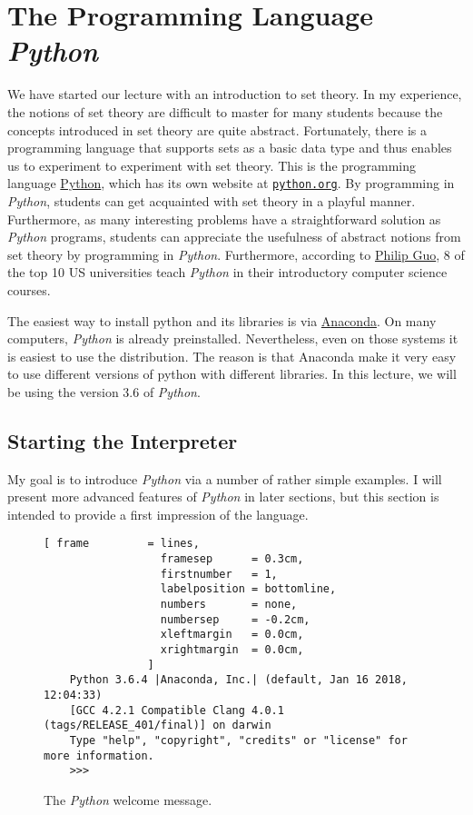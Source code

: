 \chapter{The Programming Language \textsl{Python}}
We have started our lecture with an introduction to set theory.  In my experience, the notions of
set theory are difficult to master for many students because the concepts introduced in set theory
are quite abstract.  Fortunately, there is a programming language that supports sets as a basic data type and
thus enables us to experiment to experiment with set theory.  This is the programming language
\href{https://en.wikipedia.org/wiki/Python_(programming_language)}{Python}, which has its own website at
\href{http://www.python.org}{\texttt{python.org}}.
By programming in \textsl{Python}, students can get acquainted with set theory in a playful manner.
Furthermore, as many interesting problems have a straightforward solution as \textsl{Python} programs,
students can appreciate the usefulness of abstract notions from set theory by programming in \textsl{Python}.
Furthermore, according to 
\href{https://cacm.acm.org/blogs/blog-cacm/176450-python-is-now-the-most-popular-introductory-teaching-language-at-top-u-s-universities/fulltext}{Philip Guo},
8 of the top 10 US universities teach \textsl{Python} in their introductory computer science courses.

The easiest way to install python and its libraries is via \href{https://www.anaconda.com/download/}{Anaconda}.
On many computers, \textsl{Python} is already preinstalled.  Nevertheless, even on those systems it is easiest
to use the  distribution.  The reason is that Anaconda make it very easy to use different
versions of python with different libraries.  In this lecture, we will be using the version 3.6 of \textsl{Python}.

\section{Starting the Interpreter}
My goal is to introduce \textsl{Python} via a number of rather simple examples.  I will present more
advanced features of \textsl{Python} in later sections, but this section is intended to provide a first
impression of the language.


\begin{figure}[!ht]
\centering
\begin{Verbatim}[ frame         = lines, 
                  framesep      = 0.3cm, 
                  firstnumber   = 1,
                  labelposition = bottomline,
                  numbers       = none,
                  numbersep     = -0.2cm,
                  xleftmargin   = 0.0cm,
                  xrightmargin  = 0.0cm,
                ]
    Python 3.6.4 |Anaconda, Inc.| (default, Jan 16 2018, 12:04:33) 
    [GCC 4.2.1 Compatible Clang 4.0.1 (tags/RELEASE_401/final)] on darwin
    Type "help", "copyright", "credits" or "license" for more information.
    >>> 
\end{Verbatim}
\vspace*{-0.3cm}
\caption{The \textsl{Python} welcome message.}
\label{fig:python}
\end{figure}

